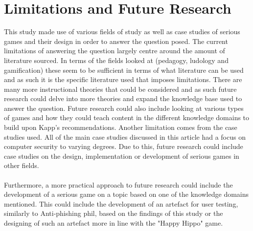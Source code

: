 \documentclass[conference]{IEEEtran}
\begin{document}
\section{Limitations and Future Research}
This study made use of various fields of study as well as case studies of serious games and their design in order to answer the question posed. The current limitations of answering the question largely centre around the amount of literature sourced. In terms of the fields looked at (pedagogy, ludology and gamification) these seem to be sufficient in terms of what literature can be used and as such it is the specific literature used that imposes limitations. There are many more instructional theories that could be considered and as such future research could delve into more theories and expand the knowledge base used to answer the question. Future research could also include looking at various types of games and how they could teach content in the different knowledge domains to build upon Kapp's\cite{Kapp2012a} recommendations. Another limitation comes from the case studies used. All of the main case studies discussed in this article had a focus on computer security to varying degrees. Due to this, future research could include case studies on the design, implementation or development of serious games in other fields.
\\\\
Furthermore, a more practical approach to future research could include the development of a serious game on a topic based on one of the knowledge domains mentioned. This could include the development of an artefact for user testing, similarly to Anti-phishing phil\cite{Sheng2007}, based on the findings of this study or the designing of such an artefact more in line with the "Happy Hippo" game\cite{allers2021children}.
\end{document}
